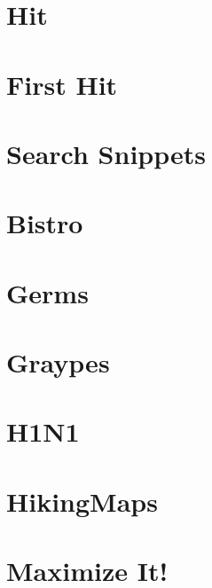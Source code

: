 \documentclass[a4paper, 10pt]{article}
\let\stdsection\section
\renewcommand\section{\newpage\stdsection}
\newcommand{\includecode}[1]{
    }
\begin{document}
    \section{Hit}
        \includecode{../problems/w06/Hit/Hit1.cpp}
        
    \section{First Hit}
        \includecode{../problems/w06/FirstHit/FirstHit1.cpp}
    
    \section{Search Snippets}
        \includecode{../problems/w06/Search_Snippets/SearchSnippets1.cpp}
              
    
    \section{Bistro}
        \includecode{../problems/w07/Bistro/Bistro1.cpp}
        
    \section{Germs}
        \includecode{../problems/w07/Germs/Germs1.cpp}
        
    \section{Graypes}
        \includecode{../problems/w07/Graypes/Graypes1.cpp}
        
    \section{H1N1}
        \includecode{../problems/w07/H1N1/H1N1_1.cpp}
    
    \section{HikingMaps}
        \includecode{../problems/w07/HikingMaps/HikingMaps1.cpp}
    
    
    \section{Maximize It!}
        \includecode{../problems/w08/WhatMaximum/MaximizeIt1.cpp}
        
\end{document}
